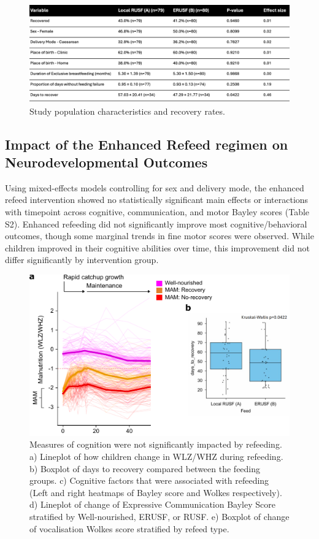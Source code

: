 \documentclass{article}
\begin{document}
\begin{figure}[H]
	\centering
	\includegraphics[scale=0.3]{../../figures/table1.pdf}
	\caption[Study population characteristics and recovery rates]{
		Study population characteristics and recovery rates.
	}
\label{Figure1}
\end{figure}

\subsection*{Impact of the Enhanced Refeed regimen on Neurodevelopmental Outcomes}
Using mixed-effects models controlling for sex and delivery mode, the enhanced refeed intervention showed no statistically significant main effects or interactions with timepoint across cognitive, communication, and motor Bayley scores (Table S2).
Enhanced refeeding did not significantly improve most cognitive/behavioral outcomes, though some marginal trends in fine motor scores were observed.
While children improved in their cognitive abilities over time, this improvement did not differ significantly by intervention group.

\begin{figure}[H]
\centering
\includegraphics[scale=1.2]{../../figures/anthrochange_simple.pdf}
	\caption[Measures of cognition were not significantly impacted by refeeding]{
		Measures of cognition were not significantly impacted by refeeding.
		a) Lineplot of how children change in WLZ/WHZ during refeeding.
		b) Boxplot of days to recovery compared between the feeding groups.
		c) Cognitive factors that were associated with refeeding (Left and right heatmaps of Bayley score and Wolkes respectively).
		d) Lineplot of change of Expressive Communication Bayley Score stratified by Well-nourished, ERUSF, or RUSF.
		e) Boxplot of change of vocalisation Wolkes score stratified by refeed type.
	}
\label{Figure2}
\end{figure}
\end{document}
